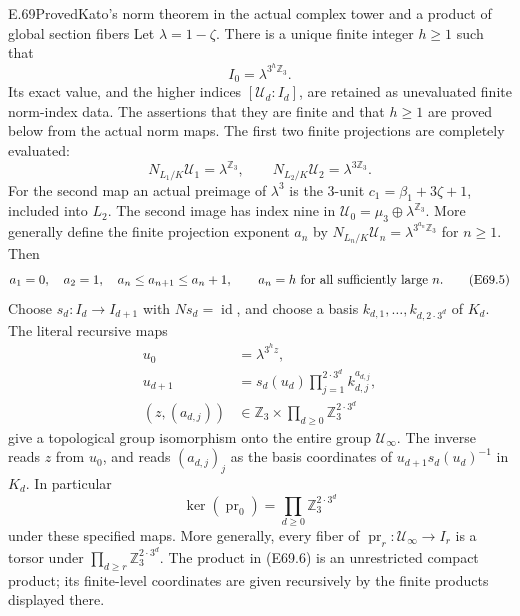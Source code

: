 \begin{statement}{E.69}{Proved}{Kato's norm theorem in the actual complex tower and a product of global section fibers}
Let $\lambda=1-\zeta$. There is a unique finite integer $h\ge1$
such that
\[
                   I_0=\lambda^{3^h\mathbb Z_3}.
 \tag{E69.3}
\]
Its exact value, and the higher indices
$[\mathcal U_d:I_d]$, are retained as unevaluated finite norm-index
data. The assertions that they are finite and that $h\ge1$ are
proved below from the actual norm maps.
The first two finite projections are completely evaluated:
\[
 N_{L_1/K}\mathcal U_1=\lambda^{\mathbb Z_3},\qquad
 N_{L_2/K}\mathcal U_2=\lambda^{3\mathbb Z_3}.
 \tag{E69.4}
\]
For the second map an actual preimage of $\lambda^3$ is the
$3$-unit $c_1=\beta_1+3\zeta+1$, included into $L_2$.
The second image has index nine in
$\mathcal U_0=\mu_3\oplus\lambda^{\mathbb Z_3}$.
More generally define the finite projection exponent $a_n$ by
$N_{L_n/K}\mathcal U_n=\lambda^{3^{a_n}\mathbb Z_3}$ for $n\ge1$.
Then
\[
 a_1=0,\quad a_2=1,\quad
 a_n\le a_{n+1}\le a_n+1,
 \qquad a_n=h\ \hbox{for all sufficiently large }n.
 \tag{E69.5}
\]
Choose $s_d:I_d\to I_{d+1}$ with $Ns_d=\operatorname{id}$, and choose a basis
$k_{d,1},\ldots,k_{d,2\cdot3^d}$ of $K_d$.
The literal recursive maps
\[
 \begin{split}
 u_0&=\lambda^{3^h z},\\
 u_{d+1}&=s_d(u_d)
              \prod_{j=1}^{2\cdot3^d}k_{d,j}^{a_{d,j}},\\
 (z,(a_{d,j}))&\in
       \mathbb Z_3\times\prod_{d\ge0}\mathbb Z_3^{2\cdot3^d}
 \end{split}
 \tag{E69.6}
\]
give a topological group isomorphism onto the entire group
$\mathcal U_\infty$.
The inverse reads $z$ from $u_0$, and reads
$(a_{d,j})_j$ as the basis coordinates of
$u_{d+1}s_d(u_d)^{-1}$ in $K_d$.
In particular
\[
 \ker(\operatorname{pr}_0)=
       \prod_{d\ge0}\mathbb Z_3^{2\cdot3^d}
 \tag{E69.7}
\]
under these specified maps. More generally, every fiber of
$\operatorname{pr}_r:\mathcal U_\infty\to I_r$ is a torsor under
$\prod_{d\ge r}\mathbb Z_3^{2\cdot3^d}$.
The product in (E69.6) is an unrestricted compact product; its
finite-level coordinates are given recursively by the finite
products displayed there.


\end{statement}
